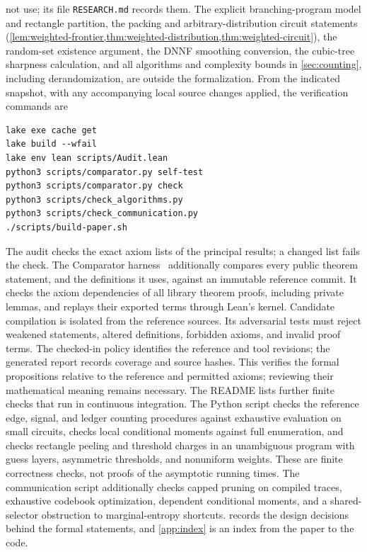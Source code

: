\documentclass[11pt]{article}
\theoremstyle{plain}
\theoremstyle{definition}
\theoremstyle{remark}
\begin{document}
not use; its file \texttt{RESEARCH.md} records them. The explicit branching-program model and rectangle
partition, the packing and arbitrary-distribution circuit statements
(\cref{lem:weighted-frontier,thm:weighted-distribution,thm:weighted-circuit}), the random-set
existence argument, the DNNF smoothing conversion, the cubic-tree sharpness calculation,
and all algorithms and complexity bounds in \cref{sec:counting}, including derandomization,
are outside the formalization.
From the indicated snapshot, with any accompanying local source changes applied, the
verification commands are
\begin{verbatim}
lake exe cache get
lake build --wfail
lake env lean scripts/Audit.lean
python3 scripts/comparator.py self-test
python3 scripts/comparator.py check
python3 scripts/check_algorithms.py
python3 scripts/check_communication.py
./scripts/build-paper.sh
\end{verbatim}
The audit checks the exact axiom lists of the principal results; a changed list fails the
check. The Comparator harness~\cite{LeanComparator} additionally compares every public theorem
statement, and the definitions it uses, against an immutable reference commit. It checks the
axiom dependencies of all library theorem proofs, including private lemmas, and replays
their exported terms through Lean's kernel. Candidate compilation is isolated from the
reference sources. Its adversarial tests must reject weakened statements, altered definitions,
forbidden axioms, and invalid proof terms. The checked-in policy identifies the reference and
tool revisions; the generated report records coverage and source hashes. This verifies the
formal propositions relative to the reference and permitted axioms; reviewing their mathematical
meaning remains necessary. The README lists further finite checks that run in continuous integration.
The Python script checks the reference edge, signal, and ledger counting
procedures against exhaustive evaluation on small circuits, checks local conditional moments
against full enumeration, and checks rectangle peeling and threshold charges in an unambiguous
program with guess layers, asymmetric thresholds, and nonuniform weights. These are finite
correctness checks, not proofs of the asymptotic
running times. The communication script additionally checks capped pruning on compiled
traces, exhaustive codebook optimization, dependent conditional moments, and a
shared-selector obstruction to marginal-entropy shortcuts.
 records the design decisions behind the formal statements,
and \cref{app:index} is an index from the paper to the code.
\end{document}
